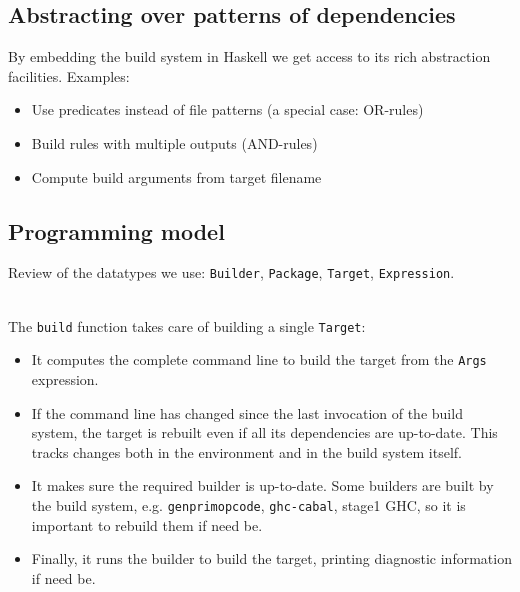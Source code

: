 \subsection{Abstracting over patterns of dependencies}



By embedding the build system in Haskell we get access to its rich abstraction
facilities. Examples:
\begin{itemize}
  \item Use predicates instead of file patterns (a special case: OR-rules)
  \item Build rules with multiple outputs (AND-rules)
  \item Compute build arguments from target filename
\end{itemize}

\subsection{Programming model}

Review of the datatypes we use: \texttt{Builder}, \texttt{Package},
\texttt{Target}, \texttt{Expression}. 

~\\
\noindent The \texttt{build} function takes care of building a single
\texttt{Target}:
\begin{itemize}
  \item It computes the complete command line to build the target from the
  \texttt{Args} expression.
  \item If the command line has changed since the last invocation of the build
  system, the target is rebuilt even if all its dependencies are up-to-date.
  This tracks changes both in the environment and in the build system itself.
  \item It makes sure the required builder is up-to-date. Some builders are
  built by the build system, e.g. \texttt{genprimopcode}, \texttt{ghc-cabal},
  stage1 GHC, so it is important to rebuild them if need be.
  \item Finally, it runs the builder to build the target, printing diagnostic
  information if need be.
\end{itemize}
